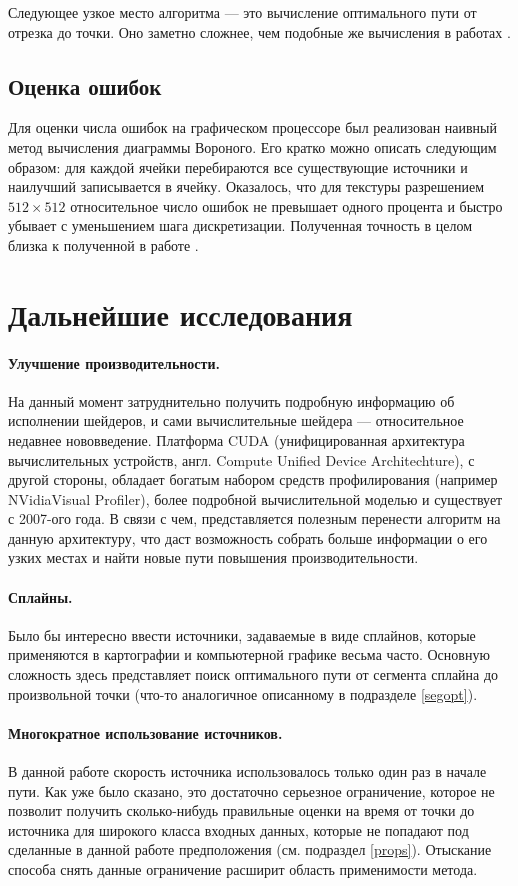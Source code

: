 \documentclass[12pt]{article}
\begin{document}
Следующее узкое место алгоритма --- это вычисление оптимального пути от отрезка
до точки. Оно заметно сложнее, чем подобные же вычисления в работах \cite{jfa, gvd}.

\subsection{Оценка ошибок}
Для оценки числа ошибок на графическом процессоре был реализован наивный метод
вычисления диаграммы Вороного. Его кратко можно описать следующим образом:
для каждой ячейки перебираются все существующие источники и наилучший записывается 
в ячейку. Оказалось, что для текстуры разрешением $512 \times 512$ относительное 
число ошибок не превышает одного процента и быстро убывает с 
уменьшением шага дискретизации. Полученная точность в целом близка к полученной
в работе \cite{gvd}.

\section{Дальнейшие исследования}
\label{future}
\paragraph{Улучшение производительности.} На данный момент затруднительно получить
подробную информацию об исполнении шейдеров, и сами вычислительные шейдера ---
относительное недавнее нововведение. Платформа CUDA (унифицированная 
архитектура вычислительных устройств, англ. Compute Unified Device Architechture), 
с другой стороны, обладает богатым набором средств профилирования 
(например NVidia\textregistered Visual Profiler), 
более подробной вычислительной моделью и существует с 2007-ого года. В связи с чем, 
представляется полезным перенести алгоритм на данную архитектуру,
что даст возможность собрать больше информации о его узких местах 
и найти новые пути повышения производительности.

\paragraph{Сплайны.} Было бы интересно ввести источники, задаваемые в виде сплайнов,
которые применяются в картографии и компьютерной графике весьма часто. 
Основную сложность здесь представляет поиск оптимального пути от сегмента 
сплайна до произвольной точки (что-то аналогичное описанному в подразделе \ref{segopt}).

\paragraph{Многократное использование источников.} В данной работе скорость
источника использовалось только один раз в начале пути.
Как уже было сказано, это достаточно серьезное ограничение, которое не позволит 
получить сколько-нибудь правильные оценки на время от точки до источника
для широкого класса входных данных, которые не попадают под 
сделанные в данной работе предположения (см. подраздел \ref{props}). Отыскание способа
снять данные ограничение расширит область применимости метода.
\end{document}
